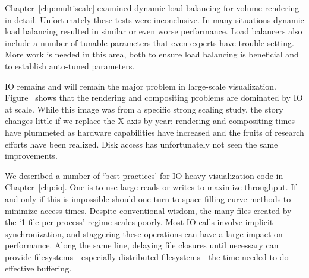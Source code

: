 Chapter~\ref{chp:multiscale} examined dynamic load balancing for volume
rendering in detail.  Unfortunately these tests were inconclusive.  In
many situations dynamic load balancing resulted in similar or even
worse performance.  Load balancers also include a number of tunable
parameters that even experts have trouble setting.  More work is needed
in this area, both to ensure load balancing is beneficial and to
establish auto-tuned parameters.






IO remains and will remain the major problem in large-scale
visualization.  Figure~\todo{\ref{fixme}} shows that the rendering and
compositing problems are dominated by IO at scale.  While this image
was from a specific strong scaling study, the story changes little if
we replace the X axis by year: rendering and compositing times have
plummeted as hardware capabilities have increased and the fruits of
research efforts have been realized.  Disk access has unfortunately not
seen the same improvements.

We described a number of `best practices' for IO-heavy visualization
code in Chapter~\ref{chp:io}.  One is to use large reads or writes to
maximize throughput.  If and only if this is impossible should one
turn to space-filling curve methods to minimize access times.  Despite
conventional wisdom, the many files created by the `1 file per process'
regime scales poorly.  Most IO calls involve implicit synchronization,
and staggering these operations can have a large impact on performance.
Along the same line, delaying file closures until necessary can provide
filesystems---especially distributed filesystems---the time needed to
do effective buffering.

